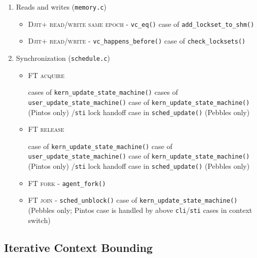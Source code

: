 \begin{enumerate}
	\item Reads and writes ({\tt memory.c})
	\begin{itemize}
		\item \textsc{Djit+ read/write same epoch} - {\tt vc\_eq()} case of {\tt add\_lockset\_to\_shm()}
		\item \textsc{Djit+ read/write} - {\tt vc\_happens\_before()} case of {\tt check\_locksets()}
	\end{itemize}
	\item Synchronization ({\tt schedule.c})
	\begin{itemize}
		\item \textsc{FT acquire}
			\begin{itemize}
				 cases of {\tt kern\_update\_state\_\allowbreak{}machine()}
				 cases of {\tt user\_update\_state\_\allowbreak{}machine()}
				 case of {\tt kern\_update\_state\_machine()} (Pintos only)
				/{\tt sti} lock handoff case in {\tt sched\_update()} (Pebbles only)
			\end{itemize}
		\item \textsc{FT release}
			\begin{itemize}
				 case of {\tt kern\_update\_state\_machine()}
				 case of {\tt user\_update\_state\_machine()}
				 case of {\tt kern\_update\_state\_machine()} (Pintos only)
				/{\tt sti} lock handoff case in {\tt sched\_update()} (Pebbles only)
			\end{itemize}
		\item \textsc{FT fork} - {\tt agent\_fork()}
		\item \textsc{FT join} - {\tt sched\_unblock()} case of {\tt kern\_update\_state\_machine()}
			(Pebbles only; Pintos case is handled by above {\tt cli}/{\tt sti} cases in context switch)
	\end{itemize}
\end{enumerate}


\subsection{Iterative Context Bounding}
\label{sec:landslide-icb}

